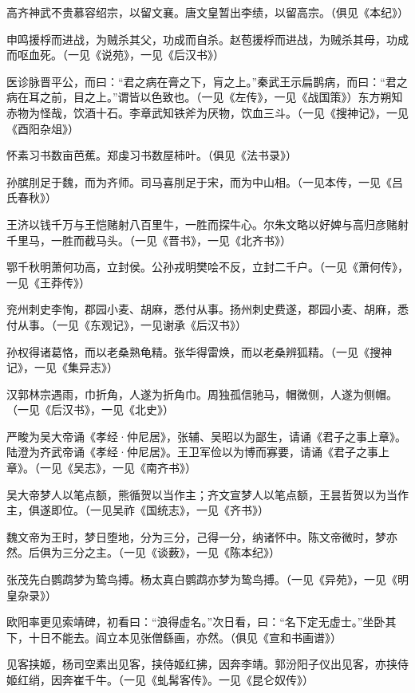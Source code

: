 \documentclass[a4paper,12pt,UTF8,twoside]{ctexbook}
\begin{document}
    高齐神武不贵慕容绍宗，以留文襄。唐文皇暂出李绩，以留高宗。（俱见《本纪》）
    
    申鸣援桴而进战，为贼杀其父，功成而自杀。赵苞援桴而进战，为贼杀其母，功成而呕血死。（一见《说苑》，一见《后汉书》）
    
    医诊脉晋平公，而曰：“君之病在膏之下，肓之上。”秦武王示扁鹊病，而曰：“君之病在耳之前，目之上。”谓皆以色致也。（一见《左传》，一见《战国策》）东方朔知赤物为怪哉，饮酒十石。李章武知铁斧为厌物，饮血三斗。（一见《搜神记》，一见《酉阳杂俎》）
    
    怀素习书数亩芭蕉。郑虔习书数屋柿叶。（俱见《法书录》）
    
    孙膑刖足于魏，而为齐师。司马喜刖足于宋，而为中山相。（一见本传，一见《吕氏春秋》）
    
    王济以钱千万与王恺赌射八百里牛，一胜而探牛心。尔朱文略以好婢与高归彦赌射千里马，一胜而截马头。（一见《晋书》，一见《北齐书》）
    
    鄂千秋明萧何功高，立封侯。公孙戎明樊哙不反，立封二千户。（一见《萧何传》，一见《王莽传》）
    
    兖州刺史李恂，郡园小麦、胡麻，悉付从事。扬州刺史费遂，郡园小麦、胡麻，悉付从事。（一见《东观记》，一见谢承《后汉书》）
    
    孙权得诸葛恪，而以老桑熟龟精。张华得雷焕，而以老桑辨狐精。（一见《搜神记》，一见《集异志》）
    
    汉郭林宗遇雨，巾折角，人遂为折角巾。周独孤信驰马，帽微侧，人遂为侧帽。（一见《后汉书》，一见《北史》）
    
    严畯为吴大帝诵《孝经·仲尼居》，张辅、吴昭以为鄙生，请诵《君子之事上章》。陆澄为齐武帝诵《孝经·仲尼居》。王卫军俭以为博而寡要，请诵《君子之事上章》。（一见《吴志》，一见《南齐书》）
    
    吴大帝梦人以笔点额，熊循贺以当作主；齐文宣梦人以笔点额，王昙哲贺以为当作主，俱遂即位。（一见吴祚《国统志》，一见《齐书》）
    
    魏文帝为王时，梦日堕地，分为三分，己得一分，纳诸怀中。陈文帝微时，梦亦然。后俱为三分之主。（一见《谈薮》，一见《陈本纪》）
    
    张茂先白鹦鹉梦为鸷鸟搏。杨太真白鹦鹉亦梦为鸷鸟搏。（一见《异苑》，一见《明皇杂录》）
    
    欧阳率更见索靖碑，初看曰：“浪得虚名。”次日看，曰：“名下定无虚士。”坐卧其下，十日不能去。阎立本见张僧繇画，亦然。（俱见《宣和书画谱》）
    
    见客挟姬，杨司空素出见客，挟侍姬红拂，因奔李靖。郭汾阳子仪出见客，亦挟侍姬红绡，因奔崔千牛。（一见《虬髯客传》。一见《昆仑奴传》）
    
\end{document}
